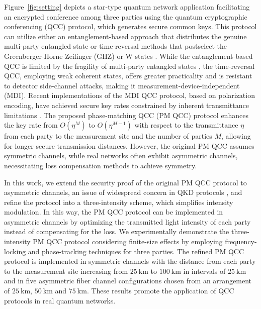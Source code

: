\documentclass[aps,twocolumn,superscriptaddress,showpacs,nofootinbib]{revtex4-2}
\begin{document}
Figure~\ref{fig:setting} depicts a star-type quantum network application facilitating an encrypted conference among three parties using the quantum cryptographic conferencing (QCC) protocol, which generates secure common keys. This protocol can utilize either an entanglement-based approach that distributes the genuine multi-party entangled state \cite{QICChen2007, NJoPEpping2017, NJoPGrasselli2018} or time-reversal methods that postselect the Greenberger-Horne-Zeilinger (GHZ)\cite{PRLFu2015, PRAZhao2020, CPXie2024} or W states \cite{NJoPGrasselli2019, PRACarrara2023}. While the entanglement-based QCC is limited by the fragility of multi-party entangled states \cite{SAProietti2021, nQIPickston2023}, the time-reversal QCC, employing weak coherent states, offers greater practicality and is resistant to detector side-channel attacks, making it measurement-device-independent (MDI). Recent implementations of the MDI QCC protocol, based on polarization encoding, have achieved secure key rates constrained by inherent transmittance limitations \cite{PRLYang2024,PRLDu2025}. The proposed phase-matching QCC (PM QCC) protocol \cite{PRAZhao2020} enhances the key rate from $O(\eta^M)$ to $O(\eta^{M-1})$ with respect to the transmittance $\eta$ from each party to the measurement site and the number of parties $M$, allowing for longer secure transmission distances. However, the original PM QCC assumes symmetric channels, while real networks often exhibit asymmetric channels, necessitating loss compensation methods to achieve symmetry.


In this work, we extend the security proof of the original PM QCC protocol to asymmetric channels, an issue of widespread concern in QKD protocols \cite{PRLLiu2019, PRXWang2019, PRAZhou2019, PRAHu2019, NJoPGrasselli2019a, NJoPWang2020, nQIZhong2021,OZhu2024}, and refine the protocol into a three-intensity scheme, which simplifies intensity modulation. In this way, the PM QCC protocol can be implemented in asymmetric channels by optimizing the transmitted light intensity of each party instead of compensating for the loss. We experimentally demonstrate the three-intensity PM QCC protocol considering finite-size effects \cite{PRAZhang2017} by employing frequency-locking and phase-tracking techniques for three parties. The refined PM QCC protocol is implemented in symmetric channels with the distance from each party to the measurement site increasing from $\SI{25}{\km}$ to $\SI{100}{\km}$ in intervals of $\SI{25}{\km}$ and in five asymmetric fiber channel configurations chosen from an arrangement of $\SI{25}{\km}$, $\SI{50}{\km}$ and $\SI{75}{\km}$. These results promote the application of QCC protocols in real quantum networks.
\end{document}

